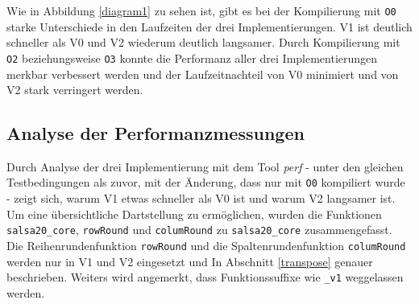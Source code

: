 \documentclass[course=erap]{aspdoc}
\begin{document}
\begin{center}
\label{diagram1}
\end{center}
Wie in Abbildung \ref{diagram1} zu sehen ist, gibt es bei der Kompilierung mit \texttt{O0} starke
Unterschiede in den Laufzeiten der drei Implementierungen. V1 ist deutlich schneller als V0 
und V2 wiederum deutlich langsamer. Durch Kompilierung mit \texttt{O2} beziehungsweise \texttt{O3}
konnte die Performanz aller drei Implementierungen merkbar verbessert werden und der Laufzeitnachteil
von V0 minimiert und von V2 stark verringert werden.

\subsection{Analyse der Performanzmessungen}
Durch Analyse der drei Implementierung mit dem Tool \emph{perf} - unter 
den gleichen Testbedingungen als zuvor, mit der Änderung, dass nur mit \texttt{O0} kompiliert wurde 
- zeigt sich, warum V1 etwas schneller als V0 ist und warum V2 langsamer ist.
Um eine übersichtliche Dartstellung zu ermöglichen, wurden die Funktionen \texttt{salsa20\_core},
\texttt{rowRound} und \texttt{columRound} zu \texttt{salsa20\_core} zusammengefasst. 
Die Reihen\-runden\-funk\-tion \texttt{rowRound} und die Spaltenrundenfunktion \texttt{columRound} werden 
nur in V1 und V2 eingesetzt und In Abschnitt \ref{transpose} genauer beschrieben.
Weiters wird angemerkt, dass Funk\-tions\-suf\-fixe wie \texttt{\_v1} weggelassen werden.
\end{document}
